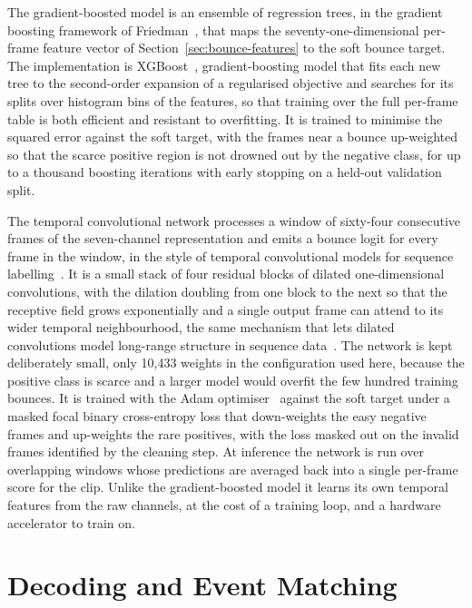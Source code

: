 The gradient-boosted model is an ensemble of regression trees, in the gradient
boosting framework of Friedman~\cite{friedman2001gbm}, that maps the
seventy-one-dimensional per-frame feature vector of Section~\ref{sec:bounce-features}
to the soft bounce target. The implementation is XGBoost~\cite{chen2016xgboost}, gradient-boosting model that fits each new tree to the second-order
expansion of a regularised objective and searches for its splits over histogram bins
of the features, so that training over the full per-frame table is both efficient and
resistant to overfitting. It is trained to minimise the squared error against the
soft target, with the frames near a bounce up-weighted so that the scarce positive
region is not drowned out by the negative class, for up to a thousand boosting
iterations with early stopping on a held-out validation split.


The temporal convolutional network processes a window of sixty-four consecutive
frames of the seven-channel representation and emits a bounce logit for every frame
in the window, in the style of temporal convolutional models for sequence
labelling~\cite{lea2017tcn,bai2018tcn}. It is a small stack of four residual
blocks of dilated one-dimensional convolutions, with the dilation doubling from one
block to the next so that the receptive field grows exponentially and a single
output frame can attend to its wider temporal neighbourhood, the same mechanism
that lets dilated convolutions model long-range structure in sequence
data~\cite{vandenoord2016wavenet}. The network is kept deliberately small, only
10{,}433 weights in the configuration used here, because the positive class is
scarce and a larger model would overfit the few hundred training bounces. It is
trained with the
Adam optimiser~\cite{kingma2015adam} against the soft target under a masked focal
binary cross-entropy loss that down-weights the easy negative frames and up-weights
the rare positives, with the loss masked out on the invalid frames identified by
the cleaning step. At inference the network is run over overlapping windows whose
predictions are averaged back into a single per-frame score for the clip. Unlike
the gradient-boosted model it learns its own temporal features from the raw
channels, at the cost of a training loop, and a hardware accelerator to train on.
\section{Decoding and Event Matching}
\label{sec:bounce-decode}

